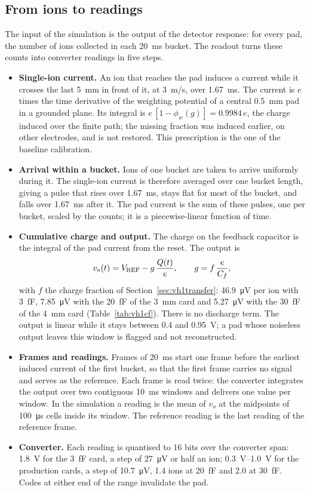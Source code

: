 \documentclass[11pt,a4paper]{article}
\newcommand{\Cf}{\ensuremath{C_f}}
\begin{document}
\subsection{From ions to readings}
\label{sec:vh1signal}
%
The input of the simulation is the output of the detector response: for
every pad, the number of ions collected in each \SI{20}{ms} bucket. The
readout turns these counts into converter readings in five steps.
%
\begin{itemize}
\item \textbf{Single-ion current.} An ion that reaches the pad induces a
  current while it crosses the last \SI{5}{mm} in front of it, at \SI{3}{m/s},
  over \SI{1.67}{ms}. The current is $e$ times the time derivative of the
  weighting potential of a central \SI{0.5}{mm} pad in a grounded plane. Its
  integral is $e\,[1-\phi_w(g)]=0.9984\,e$, the charge induced over the finite
  path; the missing fraction was induced earlier, on other electrodes, and
  is not restored. This prescription is the one of the baseline calibration.
\item \textbf{Arrival within a bucket.} Ions of one bucket are taken to
  arrive uniformly during it. The single-ion current is therefore averaged
  over one bucket length, giving a pulse that rises over \SI{1.67}{ms},
  stays flat for most of the bucket, and falls over \SI{1.67}{ms} after it.
  The pad current is the sum of these pulses, one per bucket, scaled by
  the counts; it is a piecewise-linear function of time.
\item \textbf{Cumulative charge and output.} The charge on the feedback
  capacitor is the integral of the pad current from the reset. The output is
  \[
   v_o(t) = V_{\rm REF} - g\,\frac{Q(t)}{e},
   \qquad g = f\,\frac{e}{\Cf},
  \]
  with $f$ the charge fraction of Section~\ref{sec:vh1transfer}:
  \SI{46.9}{\micro V} per ion with \SI{3}{fF}, \SI{7.85}{\micro V} with the
  \SI{20}{fF} of the \SI{3}{mm} card and \SI{5.27}{\micro V} with the
  \SI{30}{fF} of the \SI{4}{mm} card (Table~\ref{tab:vh1cf}). There is no
  discharge term. The output is linear while it stays
  between \SI{0.4}{} and \SI{0.95}{V}; a pad whose noiseless output leaves
  this window is flagged and not reconstructed.
\item \textbf{Frames and readings.} Frames of \SI{20}{ms} start one frame
  before the earliest induced current of the first bucket, so that the first
  frame carries no signal and serves as the reference. Each frame is read
  twice: the converter integrates the output over two contiguous
  \SI{10}{ms} windows and delivers one value per window. In the simulation a
  reading is the mean of $v_o$ at the midpoints of \SI{100}{\micro s} cells
  inside its window. The reference reading is the last reading of the
  reference frame.
\item \textbf{Converter.} Each reading is quantised to 16 bits over the
  converter span: \SI{1.8}{V} for the \SI{3}{fF} card, a step of
  \SI{27}{\micro V} or half an ion; \SIrange{0.3}{1.0}{V} for the
  production cards, a step of \SI{10.7}{\micro V}, \SI{1.4}{} ions at
  \SI{20}{fF} and \SI{2.0}{} at \SI{30}{fF}. Codes at either end of the
  range invalidate the pad.
\end{itemize}
\end{document}
